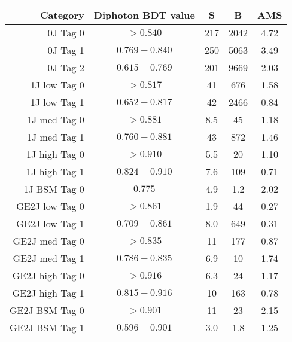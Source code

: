 \begin{tabular}{ r | c | c | c | c } 
\hline 
Category         & Diphoton BDT value & S      & B          & AMS \\
\hline 
0J Tag 0         & $ > 0.840$            & 217    & 2042       & 4.72                    \\
0J Tag 1         & $0.769-0.840$            & 250    & 5063       & 3.49                    \\
0J Tag 2         & $0.615-0.769$            & 201    & 9669       & 2.03                    \\
\hline                                                                              
1J low  Tag 0    & $ > 0.817$            & 41     & 676        & 1.58                    \\
1J low  Tag 1    & $0.652-0.817$            & 42     & 2466       & 0.84                    \\
1J med  Tag 0    & $ > 0.881$            & 8.5    & 45         & 1.18                    \\
1J med  Tag 1    & $0.760-0.881$            & 43     & 872        & 1.46                    \\
1J high Tag 0    & $ > 0.910$            & 5.5    & 20         & 1.10                    \\
1J high Tag 1    & $0.824-0.910$            & 7.6    & 109        & 0.71                    \\
1J BSM  Tag 0    & $0.775$            & 4.9    & 1.2        & 2.02                    \\
\hline                                                                              
GE2J low  Tag 0  & $ > 0.861$            & 1.9    & 44         & 0.27                    \\
GE2J low  Tag 1  & $0.709-0.861$            & 8.0    & 649        & 0.31                    \\
GE2J med  Tag 0  & $ > 0.835$            & 11     & 177        & 0.87                    \\
GE2J med  Tag 1  & $0.786-0.835$            & 6.9    & 10         & 1.74                    \\
GE2J high Tag 0  & $ > 0.916$            & 6.3    & 24         & 1.17                    \\
GE2J high Tag 1  & $0.815-0.916$            & 10     & 163        & 0.78                    \\
GE2J BSM  Tag 0  & $ > 0.901$            & 11     & 23         & 2.15                    \\
GE2J BSM  Tag 1  & $0.596-0.901$            & 3.0    & 1.8        & 1.25                    \\
\hline 
\end{tabular}
